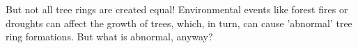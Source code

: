 
But not all tree rings are created equal! Environmental events like forest fires or droughts can affect the growth of trees, which, in turn, can cause 'abnormal' tree ring formations. But what is abnormal, anyway?

